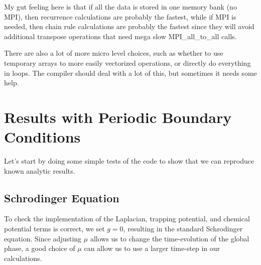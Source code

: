 \documentclass{revtex4}
\begin{document}
\begin{enumerate}
\begin{itemize}
  \end{itemize}
  My gut feeling here is that if all the data is stored in one memory bank (no MPI), then recurrence calculations are probably the fastest, while if MPI is needed, then chain rule calculations are probably the fastest since they will avoid additional transpose operations that need mega slow MPI\_all\_to\_all calls.

  There are also a lot of more micro level choices, such as whether to use temporary arrays to more easily vectorized operations, or directly do everything in loops.  The compiler should deal with a lot of this, but sometimes it needs some help.
\end{enumerate}

\section{Results with Periodic Boundary Conditions}
Let's start by doing some simple tests of the code to show that we can reproduce known analytic results.

\subsection{Schrodinger Equation}
To check the implementation of the Laplacian, trapping potential, and chemical potential terms is correct, we set $g=0$, resulting in the standard Schrodinger equation.  Since adjusting $\mu$ allows us to change the time-evolution of the global phase, a good choice of $\mu$ can allow us to use a larger time-step in our calculations.
\end{document}
